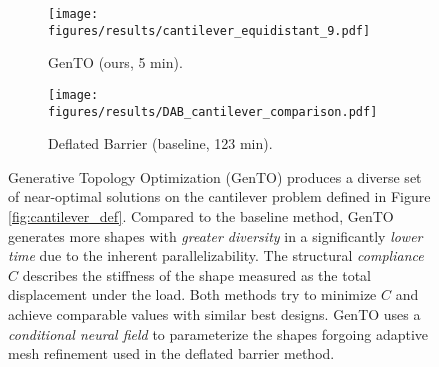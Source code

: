 

    \begin{figure}[ht!]
        \centering
        \begin{subfigure}{\columnwidth}
            \centering
            \texttt{[image: figures/results/cantilever\_equidistant\_9.pdf]}
            \caption{GenTO (ours, 5 min).}
            \label{fig:cantilever_GenTO}
        \end{subfigure}
        \hfill %
        \begin{subfigure}{\columnwidth}
            \centering
                \texttt{[image: figures/results/DAB\_cantilever\_comparison.pdf]}
            \caption{Deflated Barrier (baseline, 123 min).}
            \label{fig:cantilever_db}
        \end{subfigure}
        
        \caption{Generative Topology Optimization (GenTO) produces a diverse set of near-optimal solutions on the cantilever problem defined in Figure \ref{fig:cantilever_def}.
        Compared to the baseline method, GenTO generates more shapes with \emph{greater diversity} in a significantly \emph{lower time} due to the inherent parallelizability.
        The structural \emph{compliance} $C$ describes the stiffness of the shape measured as the total displacement under the load.
        Both methods try to minimize $C$ and achieve comparable values with similar best designs.
        GenTO uses a \emph{conditional neural field} to parameterize the shapes forgoing adaptive mesh refinement used in the deflated barrier method.}
        \label{fig:results_cantilever}
    \end{figure}

\else

